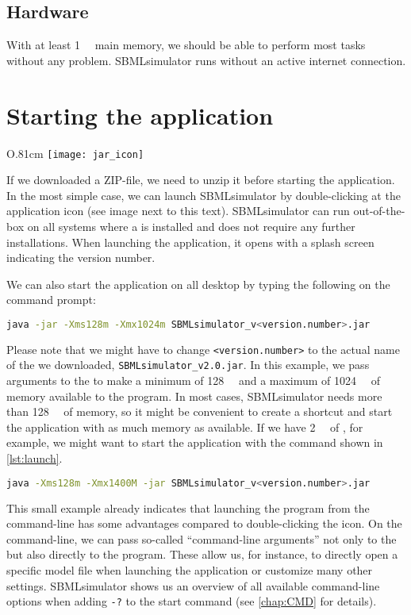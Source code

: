 \subsection{Hardware}

With at least \SI{1}{\giga\byte} main memory, we should be able to perform most tasks
without any problem.
SBMLsimulator runs without an active internet connection.

\section{Starting the application}
\label{startingTheProgram}

\begin{wrapfigure}{O}{.81cm}
\vspace{\wrapfigspace}
\texttt{[image: jar\_icon]}
\end{wrapfigure}
If we downloaded a ZIP-file, we need to unzip it before starting the application.
In the most simple case, we can launch SBMLsimulator by double-clicking at the \Java application icon (see image next to this text).
SBMLsimulator can run out-of-the-box on all systems where a \JVM is installed and does not require any further installations.
When launching the application, it opens with a splash screen indicating the version number.

We can also start the application on all desktop \OS by typing the following on the command prompt:
\begin{lstlisting}[language=bash,numbers=none]
  java -jar -Xms128m -Xmx1024m SBMLsimulator_v<version.number>.jar
\end{lstlisting}
Please note that we might have to change
\texttt{<version.number>} to the actual name of the \JAR we downloaded, \eg \texttt{SBMLsimulator\_v2.0.jar}.
In this example, we pass arguments to the \JVM to make a minimum of \SI{128}{\mega\byte} and a maximum of \SI{1024}{\mega\byte} of memory available to the program.
In most cases, SBMLsimulator needs more than \SI{128}{\mega\byte} of memory, so it might be convenient to create a shortcut and start the application with as much memory as available.
If we have \SI{2}{\giga\byte} of \RAM, for example, we might want to start the application with the command shown in \cref{lst:launch}.
\begin{lstlisting}[language=bash,numbers=none,captionpos=t,float=b,caption={Launching SBMLsimulator from the command-line with additional memory},label={lst:launch}]
  java -Xms128m -Xmx1400M -jar SBMLsimulator_v<version.number>.jar
\end{lstlisting}
This small example already indicates that launching the program from the command-line has some advantages compared to double-clicking the icon.
On the command-line, we can pass so-called ``command-line arguments'' not only to the \JVM but also directly to the program.
These allow us, for instance, to directly open a specific model file when launching the application or customize many other settings.
SBMLsimulator shows us an overview of all available command-line options when adding \texttt{-?} to the start command (see \cref{chap:CMD} for details).

